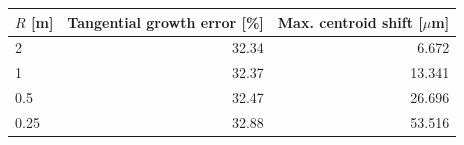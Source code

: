 \begin{tabular}{lrr}
\toprule
$R$ [m] & Tangential growth error [\%] & Max. centroid shift [$\mu$m] \\
\midrule
2 & 32.34 & 6.672 \\
1 & 32.37 & 13.341 \\
0.5 & 32.47 & 26.696 \\
0.25 & 32.88 & 53.516 \\
\bottomrule
\end{tabular}
